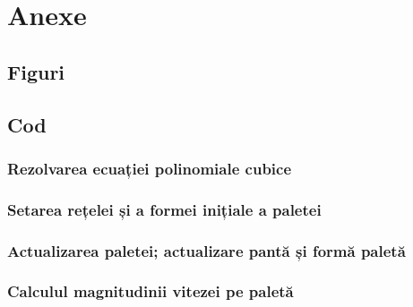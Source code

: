 \appendix

\chapter{Anexe}

\section{Figuri}

\clearpage


\section{Cod}

\subsection{Rezolvarea ecuației polinomiale cubice}



\clearpage


\subsection{Setarea rețelei și a formei inițiale a paletei}



\clearpage


\subsection{Actualizarea paletei; actualizare pantă și formă paletă}



\clearpage


\subsection{Calculul magnitudinii vitezei pe paletă}



\clearpage


\begin{comment}
\subsection{Subrutina de calcula a valorii minime a unei funcții cu variabile multiple}



\clearpage
\end{comment}


